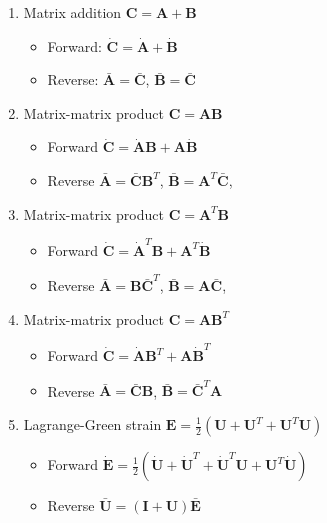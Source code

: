 \documentclass{article}
\begin{document}
\begin{enumerate}
\item Matrix addition $\mathbf{C} = \mathbf{A} + \mathbf{B}$
\begin{itemize}
\item Forward: $\dot{\mathbf{C}} =  \dot{\mathbf{A}} + \dot{\mathbf{B}}$
\item Reverse: $\bar{\mathbf{A}} =  \bar{\mathbf{C}}$, $\bar{\mathbf{B}} = \bar{\mathbf{C}}$
\end{itemize}


\item Matrix-matrix product $\mathbf{C} = \mathbf{A} \mathbf{B}$
\begin{itemize}
\item Forward $\dot{\mathbf{C}} = \dot{\mathbf{A}} \mathbf{B} + \mathbf{A} \dot{\mathbf{B}}$
\item Reverse $\bar{\mathbf{A}} = \bar{\mathbf{C}} \mathbf{B}^{T}$,  $\bar{\mathbf{B}} = \mathbf{A}^{T} \bar{\mathbf{C}}$,
\end{itemize}

\item Matrix-matrix product $\mathbf{C} = \mathbf{A}^{T} \mathbf{B}$
\begin{itemize}
\item Forward $\dot{\mathbf{C}} = \dot{\mathbf{A}}^{T} \mathbf{B} + \mathbf{A}^{T} \dot{\mathbf{B}}$
\item Reverse $\bar{\mathbf{A}} = \mathbf{B} \bar{\mathbf{C}}^{T}$,  $\bar{\mathbf{B}} = \mathbf{A} \bar{\mathbf{C}}$,
\end{itemize}

\item Matrix-matrix product $\mathbf{C} = \mathbf{A} \mathbf{B}^{T}$
\begin{itemize}
\item Forward $\dot{\mathbf{C}} = \dot{\mathbf{A}} \mathbf{B}^{T} + \mathbf{A} \dot{\mathbf{B}}^{T}$
\item Reverse $\bar{\mathbf{A}} = \bar{\mathbf{C}} \mathbf{B}$, $\bar{\mathbf{B}} = \bar{\mathbf{C}}^{T} \mathbf{A}$
\end{itemize}


\item Lagrange-Green strain $\mathbf{E} = \frac{1}{2} \left( \mathbf{U} + \mathbf{U}^{T} + \mathbf{U}^{T} \mathbf{U} \right)$
\begin{itemize}
\item Forward $\dot{\mathbf{E}} = \frac{1}{2} \left( \dot{\mathbf{U}} + \dot{\mathbf{U}}^{T} + \dot{\mathbf{U}}^{T} \mathbf{U} + \mathbf{U}^{T} \dot{\mathbf{U}} \right)$
\item Reverse $\bar{\mathbf{U}} = (\mathbf{I} + \mathbf{U}) \bar{\mathbf{E}}$
\end{itemize}


\end{enumerate}
\end{document}
